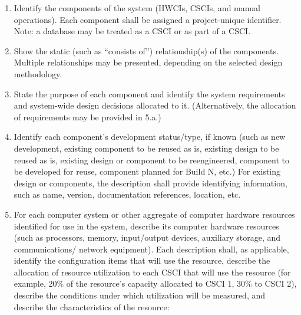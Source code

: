 \begin{enumerate}
\itemsep1pt\parskip0pt
\item
  Identify the components of the system (HWCIs, CSCIs, and manual
  operations). Each component shall be assigned a project-unique
  identifier. Note: a database may be treated as a CSCI or as part of a
  CSCI.
\item
  Show the static (such as ``consists of'') relationship(s) of the
  components. Multiple relationships may be presented, depending on the
  selected design methodology.
\item
  State the purpose of each component and identify the system
  requirements and system-wide design decisions allocated to it.
  (Alternatively, the allocation of requirements may be provided in
  5.a.)
\item
  Identify each component's development status/type, if known (such as
  new development, existing component to be reused as is, existing
  design to be reused as is, existing design or component to be
  reengineered, component to be developed for reuse, component planned
  for Build N, etc.) For existing design or components, the description
  shall provide identifying information, such as name, version,
  documentation references, location, etc.
\item
  For each computer system or other aggregate of computer hardware
  resources identified for use in the system, describe its computer
  hardware resources (such as processors, memory, input/output devices,
  auxiliary storage, and communications/ network equipment). Each
  description shall, as applicable, identify the configuration items
  that will use the resource, describe the allocation of resource
  utilization to each CSCI that will use the resource (for example, 20\%
  of the resource's capacity allocated to CSCI 1, 30\% to CSCI 2),
  describe the conditions under which utilization will be measured, and
  describe the characteristics of the resource: \\\\


\end{enumerate}

